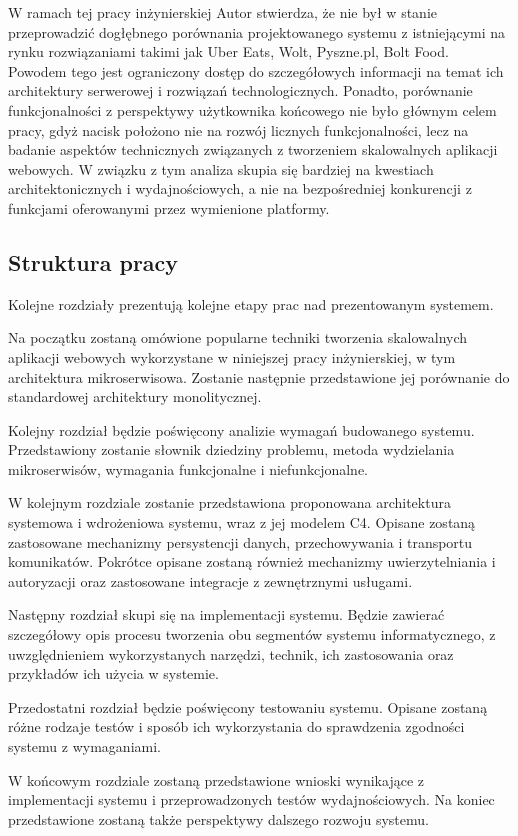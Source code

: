 W ramach tej pracy inżynierskiej Autor stwierdza, że nie był w stanie przeprowadzić dogłębnego porównania projektowanego systemu z istniejącymi na rynku rozwiązaniami takimi jak Uber Eats, Wolt, Pyszne.pl, Bolt Food. Powodem tego jest ograniczony dostęp do szczegółowych informacji na temat ich architektury serwerowej i rozwiązań technologicznych. Ponadto, porównanie funkcjonalności z perspektywy użytkownika końcowego nie było głównym celem pracy, gdyż nacisk położono nie na rozwój licznych funkcjonalności, lecz na badanie aspektów technicznych związanych z tworzeniem skalowalnych aplikacji webowych. W związku z tym analiza skupia się bardziej na kwestiach architektonicznych i wydajnościowych, a nie na bezpośredniej konkurencji z funkcjami oferowanymi przez wymienione platformy.


\subsection{Struktura pracy}

Kolejne rozdziały prezentują kolejne etapy prac nad prezentowanym systemem.

Na początku zostaną omówione popularne techniki tworzenia skalowalnych aplikacji webowych wykorzystane w niniejszej pracy inżynierskiej, w tym architektura mikroserwisowa. Zostanie następnie przedstawione jej porównanie do standardowej architektury monolitycznej.

Kolejny rozdział będzie poświęcony analizie wymagań budowanego systemu. Przedstawiony zostanie słownik dziedziny problemu, metoda wydzielania mikroserwisów, wymagania funkcjonalne i niefunkcjonalne.

W kolejnym rozdziale zostanie przedstawiona proponowana architektura systemowa i wdrożeniowa systemu, wraz z jej modelem C4. Opisane zostaną zastosowane mechanizmy persystencji danych, przechowywania i transportu komunikatów. Pokrótce opisane zostaną również mechanizmy uwierzytelniania i autoryzacji oraz zastosowane integracje z zewnętrznymi usługami.

Następny rozdział skupi się na implementacji systemu. Będzie zawierać szczegółowy opis procesu tworzenia obu segmentów systemu informatycznego, z uwzględnieniem wykorzystanych narzędzi, technik, ich zastosowania oraz przykładów ich użycia w systemie.

Przedostatni rozdział będzie poświęcony testowaniu systemu. Opisane zostaną różne rodzaje testów i sposób ich wykorzystania do sprawdzenia zgodności systemu z wymaganiami.

W końcowym rozdziale zostaną przedstawione wnioski wynikające z implementacji systemu i przeprowadzonych testów wydajnościowych. Na koniec przedstawione zostaną także perspektywy dalszego rozwoju systemu.